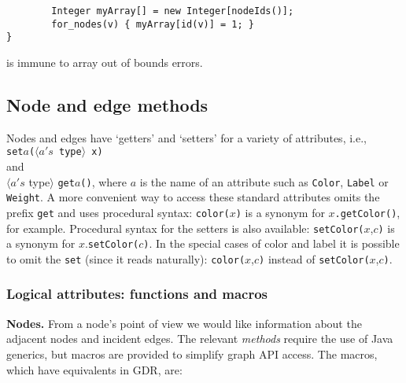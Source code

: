 \begin{minipage}{0.8\textwidth}
\begin{verbatim}
        Integer myArray[] = new Integer[nodeIds()];
        for_nodes(v) { myArray[id(v)] = 1; }
}
\end{verbatim}
\end{minipage}

is immune to array out of bounds errors.

\subsection{Node and edge methods}

Nodes and edges have `getters' and `setters' for
a variety of attributes, i.e.,
\\
\texttt{set}$a$\texttt{($\langle a's$ type$\rangle$ x)}
\\
and
\\
$\langle a's$ type$\rangle$ \texttt{get}$a$\texttt{()},
where $a$ is the name of an attribute such as
\texttt{Color},
\texttt{Label} or \texttt{Weight}.
A more convenient way to access these standard attributes omits the prefix \texttt{get}
and uses procedural syntax:
\texttt{color(}$x$\texttt{)} is a synonym for $x$\texttt{.getColor()}, for example.
Procedural syntax for the setters is also available:
\texttt{setColor(}$x$,$c$\texttt{)} is a synonym for $x$.\texttt{setColor(}$c$\texttt{)}.
In the special cases of color and label it is possible to omit the \texttt{set}
(since it reads naturally): \texttt{color(}$x$,$c$\texttt{)} instead of \texttt{setColor(}$x$,$c$\texttt{)}.

\subsubsection{Logical attributes: functions and macros}

\textbf{Nodes.}
From a node's point of view we would like information about the adjacent nodes and incident edges.
The relevant \emph{methods} require the use of Java generics, but macros are provided
to simplify graph API access. The macros, which have equivalents in GDR, are:

